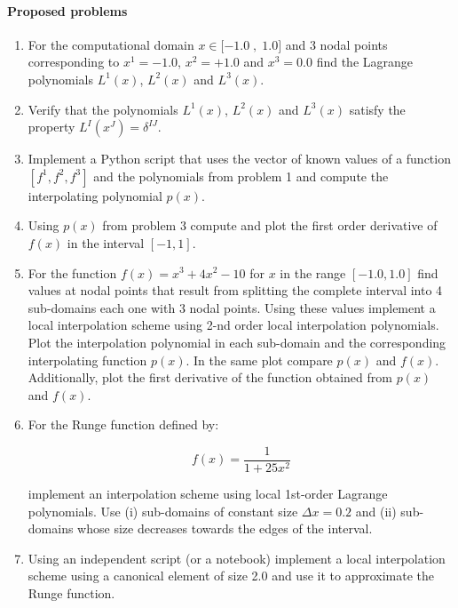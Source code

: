 \paragraph*{Proposed problems}
\begin{enumerate}

\item \label{punto01} For the computational domain $x\in\lbrack-1.0\;,\;1.0\rbrack$ and 3 nodal points corresponding to $x^1 = -1.0$, $x^2 = +1.0$ and $x^3 = 0.0$ find the Lagrange polynomials $L^1(x)$, $L^2(x)$ and $L^3(x)$.

\item \label{punto02} Verify that the polynomials $L^1(x)$, $L^2(x)$ and $L^3(x)$ satisfy the property $L^I(x^J)=\delta^{IJ}$. 

\item \label{punto03} Implement a Python script that uses the vector of known values of a function $[f^1 , f^2 , f^3 ]$ and the polynomials from problem 1 and compute the interpolating polynomial $p(x)$.

\item \label{punto04} Using $p(x)$ from problem 3 compute and plot the first order derivative of $f(x)$ in the interval $[-1 , 1]$.

\item \label{punto 05} For the function  $f(x) = {x^3} + 4{x^2} - 10$ for $x$ in the range $[-1.0, 1.0]$ find values at nodal points that result from splitting the complete interval into 4 sub-domains each one with 3 nodal points. Using these values implement a local interpolation scheme using 2-nd order local interpolation polynomials. Plot the interpolation polynomial in each sub-domain and the corresponding interpolating function $p(x)$. In the same plot compare $p(x)$ and $f(x)$. Additionally, plot the first derivative of the function obtained from $p(x)$ and $f(x)$.

\item \label{punto 06} For the Runge function defined by:

\[f(x) = \frac{1}{{1 + 25{x^2}}}\]

implement an interpolation scheme using local 1st-order Lagrange polynomials. Use (i) sub-domains of constant size $\Delta x = 0.2$ and (ii) sub-domains whose size decreases towards the edges of the interval.

\item \label{punto 07} Using an independent script (or a notebook) implement a local interpolation scheme using a canonical element of size 2.0 and use it to approximate the Runge function.


\end{enumerate}
